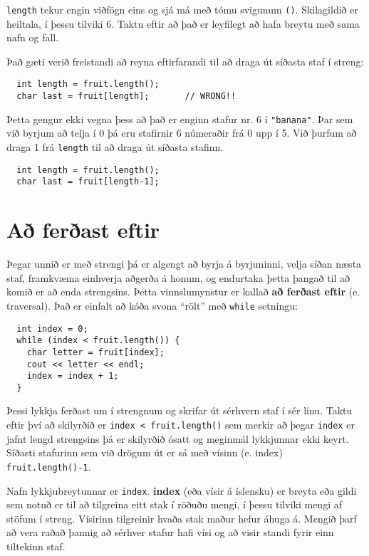 {\tt length} tekur engin viðfögn eins og sjá má með tómu svigunum {\tt ()}.
Skilagildið er heiltala, í þessu tilviki 6.
Taktu eftir að það er leyfilegt að hafa breytu með sama nafn og fall. 

Það gæti verið freistandi að reyna eftirfarandi til að draga út síðasta staf í streng:

\begin{verbatim}
  int length = fruit.length();
  char last = fruit[length];       // WRONG!!
\end{verbatim}
%
Þetta gengur ekki vegna þess að það er enginn stafur nr. 6 í \verb+"banana"+.
Þar sem við byrjum að telja í 0 þá eru stafirnir 6 númeraðir frá 0 upp í 5.
Við þurfum að draga 1 frá {\tt length} til að draga út síðasta stafinn.

\begin{verbatim}
  int length = fruit.length();
  char last = fruit[length-1];
\end{verbatim}

\section{Að ferðast eftir}

Þegar unnið er með strengi þá er algengt að byrja á byrjuninni, velja síðan næsta staf, 
framkvæma einhverja aðgerða á honum, og endurtaka þetta þangað til að komið er að enda strengsins.
Þetta vinnslumynstur er kallað {\bf að ferðast eftir} (e. traversal).
Það er einfalt að kóða svona ``rölt'' með {\tt while} setningu:

\begin{verbatim}
  int index = 0;
  while (index < fruit.length()) {
    char letter = fruit[index];
    cout << letter << endl;
    index = index + 1;
  }
\end{verbatim}
%
Þessi lykkja ferðast um í strengnum og skrifar út sérhvern staf í sér línu.
Taktu eftir því að skilyrðið er {\tt index < fruit.length()} sem merkir að þegar {\tt index} er jafnt lengd strengsins þá
er skilyrðið ósatt og meginmál lykkjunnar ekki keyrt.
Síðasti stafurinn sem við drögum út er sá með vísinn (e. index) {\tt fruit.length()-1}.


Nafn lykkjubreytunnar er {\tt index}.
{\bf index} (eða vísir á íslensku) er breyta eða gildi sem notuð er til að tilgreina eitt stak í röðuðu mengi, í þessu tilviki mengi af stöfum í streng.
Vísirinn tilgreinir hvaða stak maður hefur áhuga á.
Mengið þarf að vera raðað þannig að sérhver stafur hafi vísi og að visir standi fyrir einn tiltekinn staf.

